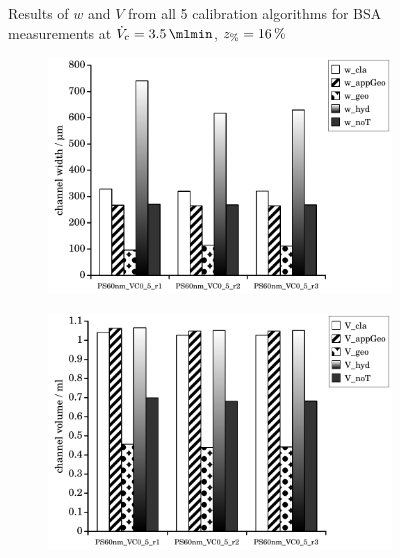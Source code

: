 \begin{figure}[htp]
\begin{center}
\begin{subfigure}{\subFigSize}
    \end{subfigure}
  \end{center}
  \vspace*{-4ex}    
  \caption[Results of $w$ and $V$ from all 5 calibration algorithms for BSA measurements at
  $\Vc = \SI{3.5}{\mlmin}$, $\zP = \SI{16}{\percent}$]{
    Results of $w$ and $V$ from all 5 calibration algorithms for BSA measurements at
    $\Vc = \SI{3.5}{\mlmin}$, $\zP = \SI{16}{\percent}$
  }
  \label{fig:calibRes_BSA_VC3_5_p16}
\end{figure}
\begin{figure}[!hb]
  \begin{center}
    \begin{subfigure}{\subFigSize}
      \includegraphics[width=\linewidth]{./images/data/eval_own_p16/calibW_PS_VC_0_5_p16.pdf}
    \end{subfigure}
    \begin{subfigure}{\subFigSize}
      \includegraphics[width=\linewidth]{./images/data/eval_own_p16/calibV_PS_VC_0_5_p16.pdf}

\end{subfigure}
\end{center}
\end{figure}
